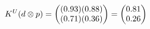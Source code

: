 \documentclass[preview]{standalone}
\begin{document}
\begin{align*}
\special{dvisvgm:raw <g id='unique000'>}K^U(d \otimes p) = \begin{pmatrix} (0.93)(0.88) \\ (0.71)(0.36) \end{pmatrix} = \begin{pmatrix} 0.81 \\ 0.26 \end{pmatrix}\special{dvisvgm:raw </g>}
\end{align*}
\end{document}
